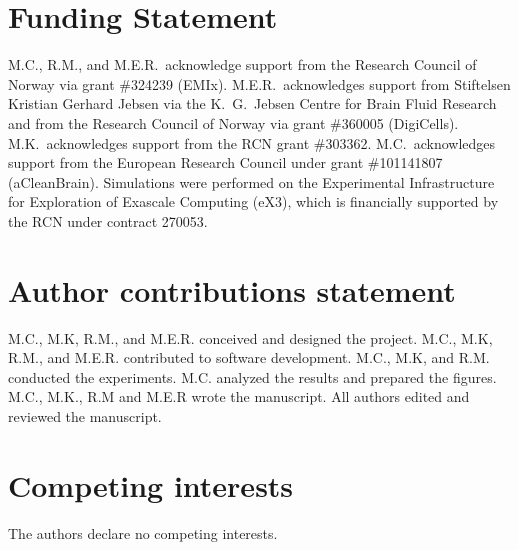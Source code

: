 \documentclass[fleqn,10pt]{wlscirep}
\begin{document}
\section*{Funding Statement}

M.C., R.M., and M.E.R.~acknowledge support from the Research Council of Norway via grant \#324239 (EMIx). M.E.R.~acknowledges support from Stiftelsen Kristian Gerhard Jebsen via the K.~G.~Jebsen Centre for Brain Fluid Research and from the Research Council of Norway via grant \#360005 (DigiCells). M.K.~acknowledges support from the RCN grant \#303362. M.C.~acknowledges support from the European Research Council under grant \#101141807 (aCleanBrain). Simulations were performed on the Experimental Infrastructure for Exploration of Exascale Computing (eX3), which is financially supported by the RCN under contract 270053. 

\section*{Author contributions statement}

M.C., M.K, R.M., and M.E.R. conceived and designed the project.
M.C., M.K, R.M., and M.E.R. contributed to software development. 
M.C., M.K, and R.M. conducted the experiments.
M.C. analyzed the results and prepared the figures.
M.C., M.K., R.M and M.E.R wrote the manuscript. 
All authors edited and reviewed the manuscript.

\section*{Competing interests}

The authors declare no competing interests.



\end{document}
